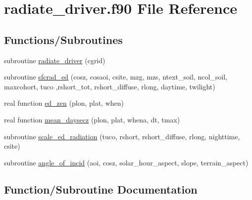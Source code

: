 \hypertarget{radiate__driver_8f90}{}\section{radiate\+\_\+driver.\+f90 File Reference}
\label{radiate__driver_8f90}
\subsection*{Functions/\+Subroutines}
\begin{DoxyCompactItemize}
\item 
subroutine \hyperlink{radiate__driver_8f90_ab00f8ed30131a8759492cb10c7bdb13a}{radiate\+\_\+driver} (cgrid)
\item 
subroutine \hyperlink{radiate__driver_8f90_aa7642a6b7c3a9578373f6f05492956ec}{sfcrad\+\_\+ed} (cosz, cosaoi, csite, mzg, mzs, ntext\+\_\+soil, ncol\+\_\+soil, maxcohort, tuco                                                                                                           ,rshort\+\_\+tot, rshort\+\_\+diffuse, rlong, daytime, twilight)
\item 
real function \hyperlink{radiate__driver_8f90_a2a40f6616130a988dc00df00fd848de5}{ed\+\_\+zen} (plon, plat, when)
\item 
real function \hyperlink{radiate__driver_8f90_a43ec6176af1ff5ea603858cec577ff95}{mean\+\_\+daysecz} (plon, plat, whena, dt, tmax)
\item 
subroutine \hyperlink{radiate__driver_8f90_a20652a9e1fed5b3bf4eabdf48c924058}{scale\+\_\+ed\+\_\+radiation} (tuco, rshort, rshort\+\_\+diffuse, rlong, nighttime, csite)
\item 
subroutine \hyperlink{radiate__driver_8f90_a173664babf281d82aa440bf111ad9d2a}{angle\+\_\+of\+\_\+incid} (aoi, cosz, solar\+\_\+hour\+\_\+aspect, slope, terrain\+\_\+aspect)
\end{DoxyCompactItemize}


\subsection{Function/\+Subroutine Documentation}
\hypertarget{radiate__driver_8f90_a173664babf281d82aa440bf111ad9d2a}{}
